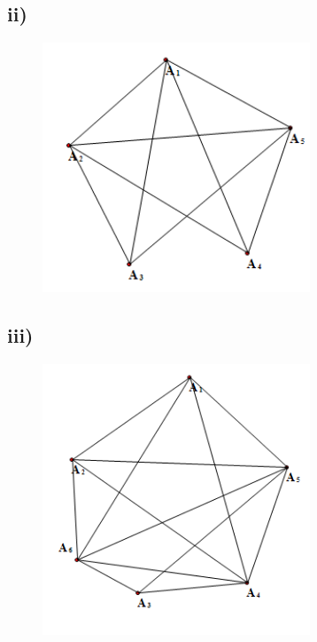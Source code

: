 \documentclass[a4paper,12pt,titlepage]{article}
\begin{document}
\subsection*{ii)}
\begin{figure}[H]
    \centering
    \includegraphics[width=8cm]{8.png}
\end{figure}
\subsection*{iii)}
\begin{figure}[H]
    \centering
    \includegraphics[width=8cm]{9.png}
\end{figure}
\end{document}
